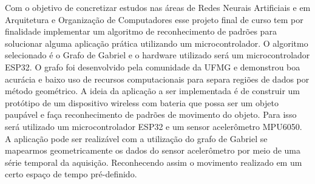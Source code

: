 
Com o objetivo de concretizar estudos nas áreas de Redes Neurais Artificiais e
em Arquitetura e Organização de Computadores esse projeto final de curso tem por finalidade
implementar um algoritmo de reconhecimento de padrões para solucionar alguma aplicação prática utilizando um microcontrolador.
O algoritmo selecionado é o Grafo de Gabriel\cite{GabrielGraph1} e o hardware utilizado será um microcontrolador ESP32. O grafo foi 
desenvolvido pela comunidade da UFMG e demonstrou boa acurácia e baixo uso de recursos computacionais para separa regiões de dados por método geométrico.
A ideia da aplicação a ser implementada é de construir um protótipo de um dispositivo wireless com bateria que possa 
ser um objeto paupável e faça reconhecimento de padrões de movimento do objeto. Para isso será utilizado um microcontrolador ESP32 
e um sensor acelerômetro MPU6050. A aplicação pode ser realizável com a utilização do grafo de Gabriel se mapearmos geometricamente os dados do sensor acelerômetro por meio de uma
série temporal da aquisição. Reconhecendo assim o movimento realizado em um certo espaço de tempo pré-definido.


